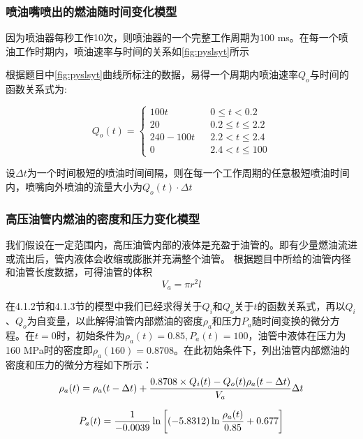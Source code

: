 \documentclass[withoutpreface,bwprint]{cumcmthesis} %
\begin{document}
\subsubsection{喷油嘴喷出的燃油随时间变化模型}

因为喷油器每秒工作10次，则喷油器的一个完整工作周期为100 ms。在每一个喷油工作时期内，喷油速率与时间的关系如\cref{fig:pyslsyt}所示

根据题目中\cref{fig:pyslsyt}曲线所标注的数据，易得一个周期内喷油速率$Q_o$与时间的函数关系式为:

\begin{equation}
Q_o(t)=\left\{
\begin{array}{lcc}
100t & & { 0\le t<0.2}\\
20 & & {0.2\le t\le 2.2}\\
240-100t & & {2.2<t\le 2.4}\\
0 & & {2.4<t\le 100}
\end{array} \right.
 \end{equation}
 
设$\Delta t$为一个时间极短的喷油时间间隔，则在每一个工作周期的任意极短喷油时间内，喷嘴向外喷油的流量大小为$Q_o(t)\cdot \Delta t $
	
	
\subsubsection{高压油管内燃油的密度和压力变化模型}
	
我们假设在一定范围内，高压油管内部的液体是充盈于油管的。即有少量燃油流进或流出后，管内液体会收缩或膨胀并充满整个油管。
%
根据题目中所给的油管内径和油管长度数据，可得油管的体积
\begin{equation}
	V_{a}=\pi r^{2}l	
\end{equation}

在4.1.2节和4.1.3节的模型中我们已经求得关于$Q_i$和$Q_o$关于$t$的函数关系式，再以$Q_i$、$Q_o$为自变量，以此解得油管内部燃油的密度$\rho_{a}$和压力$P_a$随时间变换的微分方程。在$t=0$时，初始条件为$\rho_{a} (t)=0.85,P_{a}(t)=100$，油管中液体在压力为160 MPa时的密度即$\rho_{a}(160)=0.8708$。在此初始条件下，列出油管内部燃油的密度和压力的微分方程如下所示：
\begin{equation} \label{eq:rho_{a}(t)}
\rho_{a}(t)=\rho_{a}(t-\Delta t)+\frac{0.8708\times Q_i(t) -Q_o(t)\rho_{a}(t-\Delta t)}{V_{a}}	\Delta t
\end{equation}
	
\begin{equation} \label{eq:P_{a}(t)}
P_{a}(t)=\frac{1}{-0.0039}\ln \left[\left(-5.8312 \right) \ln \frac{\rho_{a}(t)}{0.85}+0.677\right]
\end{equation}
\end{document}
